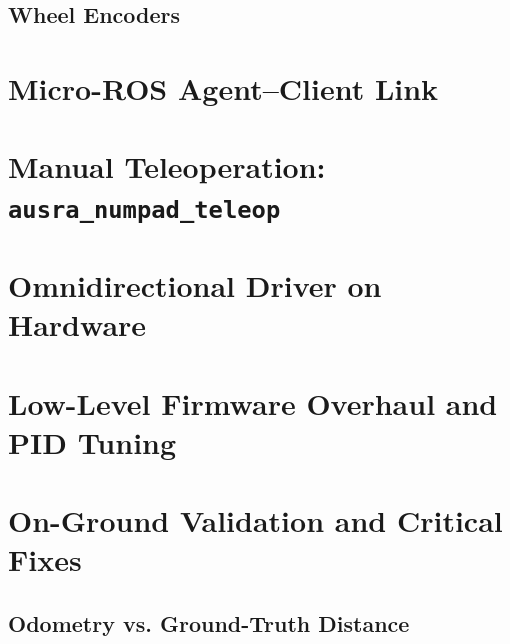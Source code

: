 \subsection{Wheel Encoders}
\label{subsec:hw_encoder_test}

\section{Micro-ROS Agent--Client Link}
\label{sec:microros_link}

\section{Manual Teleoperation: \texttt{ausra\_numpad\_teleop}}
\label{sec:numpad_teleop}

\section{Omnidirectional Driver on Hardware}
\label{sec:omni_driver_hw}

\section{Low-Level Firmware Overhaul and PID Tuning}
\label{sec:firmware_pid_tuning}

\section{On-Ground Validation and Critical Fixes}
\label{sec:onground_validation}

\subsection{Odometry vs. Ground-Truth Distance}
\label{subsec:odom_vs_truth}

